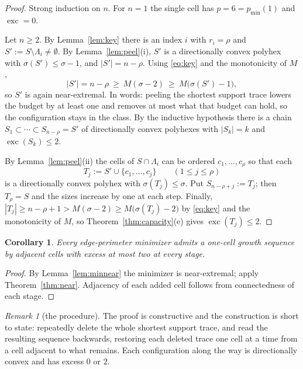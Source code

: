 \documentclass[11pt]{article}
\theoremstyle{plain}
\newtheorem{corollary}[theorem]{Corollary}
\theoremstyle{definition}
\theoremstyle{remark}
\newtheorem{remark}[theorem]{Remark}
\newcommand{\sm}{\setminus}
\DeclareMathOperator{\exc}{exc}
\begin{document}
\begin{proof}
Strong induction on \(n\). For \(n=1\) the single cell has \(p=6=p_{\min}(1)\) and
\(\exc=0\).

Let \(n\ge2\). By Lemma~\ref{lem:key} there is an index \(i\) with \(r_{i}=\rho\) and
\(S':=S\sm\Lambda_{i}\neq\emptyset\). By Lemma~\ref{lem:peel}(i), \(S'\) is a directionally
convex polyhex with \(\sigma(S')\le\sigma-1\), and \(|S'|=n-\rho\). Using
\eqref{eq:key} and the monotonicity of \(M\),
\[
   |S'|=n-\rho\ \ge\ M(\sigma-2)\ \ge\ M\bigl(\sigma(S')-1\bigr),
\]
so \(S'\) is again near-extremal. In words: peeling the shortest support trace lowers the
budget by at least one and removes at most what that budget can hold, so the configuration
stays in the class. By the inductive hypothesis there is a chain
\(S_{1}\subset\cdots\subset S_{n-\rho}=S'\) of directionally convex polyhexes with
\(|S_{k}|=k\) and \(\exc(S_{k})\le2\).

By Lemma~\ref{lem:peel}(ii) the cells of \(S\cap\Lambda_{i}\) can be ordered
\(c_{1},\dots,c_{\rho}\) so that each
\[
   T_{j}:=S'\cup\{c_{1},\dots,c_{j}\}\qquad(1\le j\le\rho)
\]
is a directionally convex polyhex with \(\sigma(T_{j})\le\sigma\). Put
\(S_{n-\rho+j}:=T_{j}\); then \(T_{\rho}=S\) and the sizes increase by one at each step.
Finally, \(|T_{j}|\ge n-\rho+1>M(\sigma-2)\ge M\bigl(\sigma(T_{j})-2\bigr)\) by
\eqref{eq:key} and the monotonicity of \(M\), so Theorem~\ref{thm:capacity}(e) gives
\(\exc(T_{j})\le2\).
\end{proof}

\begin{corollary}
Every edge-perimeter minimizer admits a one-cell growth sequence by adjacent cells with
excess at most two at every stage.
\end{corollary}
\begin{proof}
By Lemma~\ref{lem:minnear} the minimizer is near-extremal; apply Theorem~\ref{thm:near}.
Adjacency of each added cell follows from connectedness of each stage.
\end{proof}

\begin{remark}[the procedure]\label{rem:algorithm}
The proof is constructive and the construction is short to state: repeatedly delete the
whole shortest support trace, and read the resulting sequence backwards, restoring each
deleted trace one cell at a time from a cell adjacent to what remains. Each configuration
along the way is directionally convex and has excess \(0\) or \(2\).
\end{remark}
\end{document}
